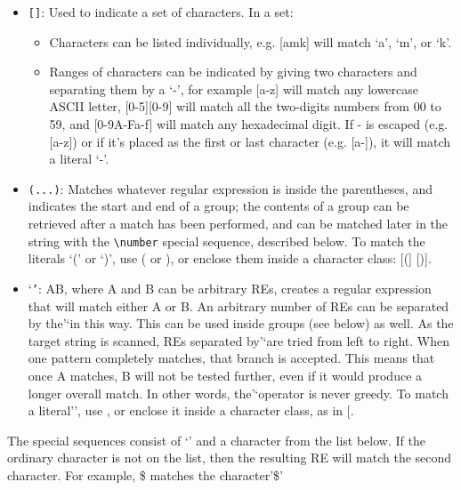 \documentclass{article}
\begin{document}
\begin{itemize}
\item
  \texttt{{[}{]}}: Used to indicate a set of characters. In a set:

  \begin{itemize}
  \itemsep1pt\parskip0pt
  \item
    Characters can be listed individually, e.g. {[}amk{]} will match
    `a', `m', or `k'.
  \item
    Ranges of characters can be indicated by giving two characters and
    separating them by a `-', for example {[}a-z{]} will match any
    lowercase ASCII letter, {[}0-5{]}{[}0-9{]} will match all the
    two-digits numbers from 00 to 59, and {[}0-9A-Fa-f{]} will match any
    hexadecimal digit. If - is escaped (e.g. {[}a-z{]}) or if it's
    placed as the first or last character (e.g. {[}a-{]}), it will match
    a literal `-'.
  \end{itemize}
\item
  \texttt{(...)}: Matches whatever regular expression is inside the
  parentheses, and indicates the start and end of a group; the contents
  of a group can be retrieved after a match has been performed, and can
  be matched later in the string with the
  \texttt{\textbackslash{}number} special sequence, described below. To
  match the literals `(' or `)', use ( or ), or enclose them inside a
  character class: {[}({]} {[}){]}.
\item
  `\texttt{\textbar{}'}: A\textbar{}B, where A and B can be arbitrary
  REs, creates a regular expression that will match either A or B. An
  arbitrary number of REs can be separated by the'\textbar{}`in this
  way. This can be used inside groups (see below) as well. As the target
  string is scanned, REs separated by'\textbar{}`are tried from left to
  right. When one pattern completely matches, that branch is accepted.
  This means that once A matches, B will not be tested further, even if
  it would produce a longer overall match. In other words,
  the'\textbar{}`operator is never greedy. To match a
  literal'\textbar{}', use \textbar{}, or enclose it inside a character
  class, as in {[}\textbar{}{]}.
\end{itemize}

The special sequences consist of `' and a character from the list below.
If the ordinary character is not on the list, then the resulting RE will
match the second character. For example, \$ matches the character'\$'
\end{document}
